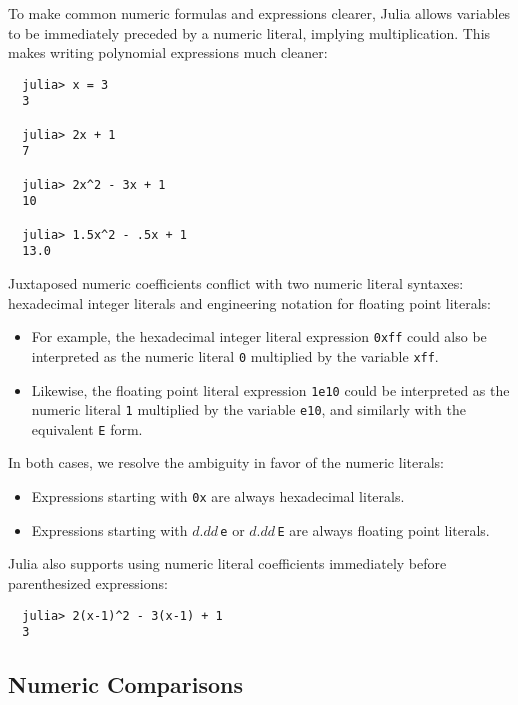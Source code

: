 \documentclass{article}
\renewcommand{\sec}[1]{\label{sec:#1}}
\begin{document}
To make common numeric formulas and expressions clearer, Julia allows variables to be immediately preceded by a numeric literal, implying multiplication.
This makes writing polynomial expressions much cleaner:
\begin{verbatim}
  julia> x = 3
  3

  julia> 2x + 1
  7

  julia> 2x^2 - 3x + 1
  10

  julia> 1.5x^2 - .5x + 1
  13.0
\end{verbatim}
Juxtaposed numeric coefficients conflict with two numeric literal syntaxes:
hexadecimal integer literals and engineering notation for floating point literals:
\begin{itemize}
\item For example, the hexadecimal integer literal expression \verb|0xff| could also be interpreted as the numeric literal \verb|0| multiplied by the variable \verb|xff|.
\item Likewise, the floating point literal expression \verb|1e10| could be interpreted as the numeric literal \verb|1| multiplied by the variable \verb|e10|, and similarly with the equivalent \verb|E| form.
\end{itemize}
In both cases, we resolve the ambiguity in favor of the numeric literals:
\begin{itemize}
\item Expressions starting with \verb|0x| are always hexadecimal literals.
\item Expressions starting with $d.dd$\,\verb|e| or $d.dd$\,\verb|E| are always floating point literals.
\end{itemize}
Julia also supports using numeric literal coefficients immediately before parenthesized expressions:
\begin{verbatim}
  julia> 2(x-1)^2 - 3(x-1) + 1
  3
\end{verbatim}

\subsection{Numeric Comparisons}\sec{numeric-comparisons}
\end{document}
